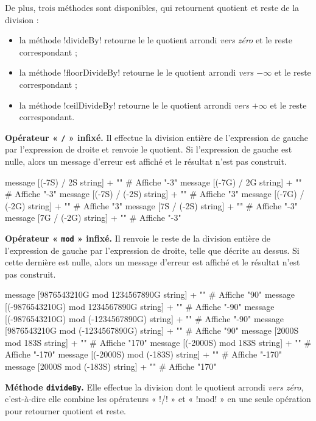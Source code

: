 De plus, trois méthodes sont disponibles, qui retournent quotient et reste de la division :
\begin{itemize}
  \item la méthode \ggs!divideBy! retourne le le quotient arrondi \emph{vers zéro} et le reste correspondant ;
  \item la méthode \ggs!floorDivideBy! retourne le le quotient arrondi \emph{vers $-\infty$} et le reste correspondant ;
  \item la méthode \ggs!ceilDivideBy! retourne le le quotient arrondi \emph{vers $+\infty$} et le reste correspondant.
\end{itemize}


\textbf{Opérateur « \texttt{/} » infixé.} Il effectue la division entière de l'expression de gauche par l'expression de droite et renvoie le quotient. Si l'expression de gauche est nulle, alors un message d'erreur est affiché et le résultat n'est pas construit.

\begin{galgas}
  message [(-7S) / 2S string] + "\n" # Affiche "-3"
  message [(-7G) / 2G string] + "\n" # Affiche "-3"
  message [(-7S) / (-2S) string] + "\n" # Affiche "3"
  message [(-7G) / (-2G) string] + "\n" # Affiche "3"
  message [7S / (-2S) string] + "\n" # Affiche "-3"
  message [7G / (-2G) string] + "\n" # Affiche "-3"
\end{galgas}



\textbf{Opérateur « \texttt{mod} » infixé.} Il renvoie le reste de la division entière de l'expression de gauche par l'expression de droite, telle que décrite au dessus. Si cette dernière est nulle, alors un message d'erreur est affiché et le résultat n'est pas construit.

\begin{galgas}
  message [9876543210G mod 1234567890G string] + "\n" # Affiche "90"
  message [(-9876543210G) mod 1234567890G string] + "\n" # Affiche "-90"
  message [(-9876543210G) mod (-1234567890G) string] + "\n"  # Affiche "-90"
  message [9876543210G mod (-1234567890G) string] + "\n"  # Affiche "90"
  message [2000S mod 183S string] + "\n" # Affiche "170"
  message [(-2000S) mod 183S string] + "\n" # Affiche "-170"
  message [(-2000S) mod (-183S) string] + "\n" # Affiche "-170"
  message [2000S mod (-183S) string] + "\n" # Affiche "170"
\end{galgas}




\textbf{Méthode \texttt{divideBy}.} Elle effectue la division dont le quotient arrondi \emph{vers zéro}, c'est-à-dire elle combine les opérateurs « \ggs!/! » et « \ggs!mod! » en une seule opération pour retourner quotient et reste.

